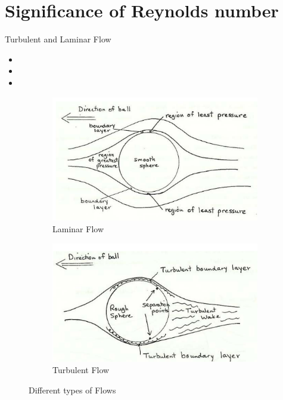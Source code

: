 \documentclass{beamer}
\begin{document}
\section{Significance of Reynolds number}
\begin{frame}{Turbulent and Laminar Flow}
    \begin{itemize}
    \item 
    
    \item
    
    \item
    
  \end{itemize}
\begin{figure}[h!]
  \centering
  \begin{subfigure}[b]{0.4\linewidth}
    \includegraphics[width=\linewidth]{./figs/laminar.png}
    \caption{Laminar Flow}
  \end{subfigure}
  \begin{subfigure}[b]{0.4\linewidth}
    \includegraphics[width=\linewidth]{./figs/turbulant.png}
    \caption{Turbulent Flow}
  \end{subfigure}
  \caption{Different types of Flows}
  \label{fig:drag1}
\end{figure}
  
  
\end{frame} 
\end{document}
